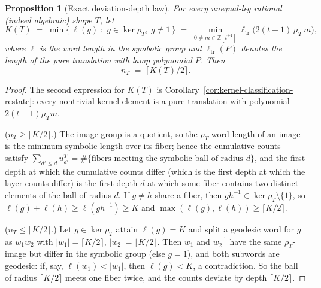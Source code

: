\documentclass[11pt]{article}
\theoremstyle{plain}
\newtheorem{proposition}[theorem]{Proposition}
\theoremstyle{definition}
\theoremstyle{remark}
\begin{document}
\begin{proposition}[Exact deviation-depth law]
\label{prop:exact-deviation}
For every unequal-leg rational (indeed algebraic) shape $T$, let
\[
K(T) \;=\; \min\bigl\{\, \ell(g) \;:\; g \in \ker\rho_T,\ g \neq 1 \,\bigr\}
\;=\; \min_{0 \neq m \in \mathbb{Z}[t^{\pm 1}]}
      \ell_{\mathrm{tr}}\bigl(2(t-1)\,\mu_T\, m\bigr),
\]
where $\ell$ is the word length in the symbolic group and
$\ell_{\mathrm{tr}}(P)$ denotes the length of the pure translation with lamp
polynomial $P$. Then
\[
n_T \;=\; \bigl\lceil K(T)/2 \bigr\rceil .
\]
\end{proposition}

\begin{proof}
The second expression for $K(T)$ is
Corollary~\ref{cor:kernel-classification-restate}: every nontrivial kernel
element is a pure translation with polynomial $2(t-1)\mu_T m$.

($n_T \ge \lceil K/2 \rceil$.) The image group is a quotient, so the
$\rho_T$-word-length of an image is the minimum symbolic length over its
fiber; hence the cumulative counts satisfy
$\sum_{d' \le d} u_{d'}^T = \#\{\text{fibers meeting the symbolic ball of
radius } d\}$, and the first depth at which the cumulative counts differ (which is the first depth at which the layer counts differ) is the first
depth $d$ at which some fiber contains two distinct elements of the ball of
radius $d$. If $g \neq h$ share a fiber, then $gh^{-1} \in \ker\rho_T
\setminus \{1\}$, so $\ell(g) + \ell(h) \ge \ell(gh^{-1}) \ge K$ and
$\max(\ell(g), \ell(h)) \ge \lceil K/2 \rceil$.

($n_T \le \lceil K/2 \rceil$.) Let $g \in \ker\rho_T$ attain $\ell(g) = K$
and split a geodesic word for $g$ as $w_1 w_2$ with
$|w_1| = \lceil K/2 \rceil$, $|w_2| = \lfloor K/2 \rfloor$. Then $w_1$ and
$w_2^{-1}$ have the same $\rho_T$-image but differ in the symbolic group
(else $g = 1$), and both subwords are geodesic: if, say,
$\ell(w_1) < |w_1|$, then $\ell(g) < K$, a contradiction. So the ball of
radius $\lceil K/2 \rceil$ meets one fiber twice, and the counts deviate by
depth $\lceil K/2 \rceil$.
\end{proof}
\end{document}
